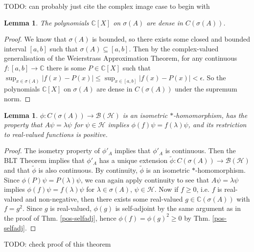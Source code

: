 \documentclass[12pt,oneside]{report}
\newtheorem{lem}[thm]{Lemma}
\begin{document}
TODO: can probably just cite the complex image case to begin with

\begin{lem}
    The polynomials $\mathbb{C}[X]$ on $\sigma(A)$ are dense in $C(\sigma(A))$.
\end{lem}
\begin{proof}
    We know that $\sigma(A)$ is bounded, so there exists some closed and bounded interval $[a,b]$ such that $\sigma(A) \subseteq [a,b]$. Then by the complex-valued generalisation of the Weierstrass Approximation Theorem, for any continuous $f: [a,b] \to \mathbb{C}$ there is some $P \in \mathbb{C}[X]$ such that $\sup_{x\in\sigma(A)} |f(x) - P(x)| \leq \sup_{x\in[a,b]} |f(x) - P(x)| < \epsilon$. So the polynomials $\mathbb{C}[X]$ on $\sigma(A)$ are dense in $C(\sigma(A))$ under the supremum norm.
\end{proof}

\begin{lem}
    $\phi: C(\sigma(A)) \to \mathscr{B}(\mathscr{H})$ is an isometric $*$-homomorphism, has the property that $A\psi = \lambda \psi$ for $\psi \in \mathscr{H}$ implies $\phi(f)\psi = f(\lambda)\psi$, and its restriction to real-valued functions is positive.
\end{lem}
\begin{proof}
    The isometry property of $\phi'_{A}$ implies that $\phi'_{A}$ is continuous. Then the BLT Theorem implies that $\phi'_{A}$ has a unique extension $\tilde{\phi}: C(\sigma(A)) \to \mathscr{B}(\mathscr{H})$ and that $\tilde{\phi}$ is also continuous. By continuity, $\tilde{\phi}$ is an isometric $*$-homomorphism. Since $\phi(P)\psi = P(\lambda)\psi$, we can again apply continuity to see that $A\psi = \lambda \psi$ implies $\phi(f)\psi = f(\lambda)\psi$ for $\lambda \in \sigma(A)$, $\psi \in \mathscr{H}$. Now if $f \geq 0$, i.e. $f$ is real-valued and non-negative, then there exists some real-valued $g \in \mathbb{C}(\sigma(A))$ with $f = g^{2}$. Since $g$ is real-valued, $\phi(g)$ is self-adjoint by the same argument as in the proof of Thm. \ref{pos-selfadj}, hence $\phi(f) = \phi(g)^{2} \geq 0$ by Thm. \ref{pos-selfadj}.
\end{proof}

TODO: check proof of this theorem
\end{document}
